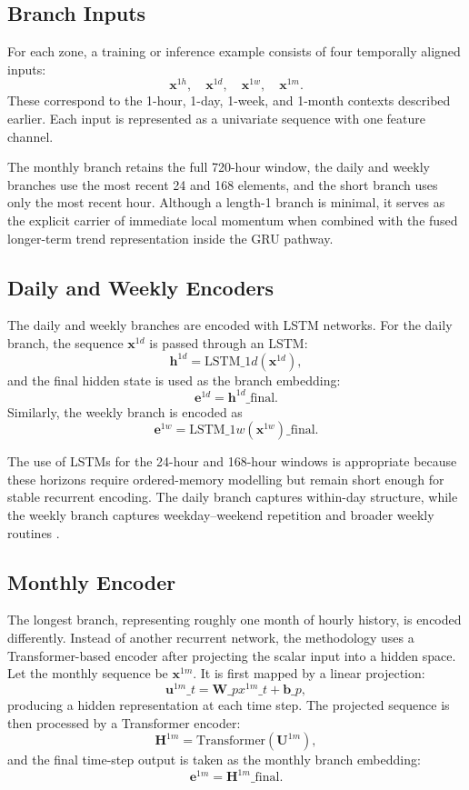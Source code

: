 \documentclass[12pt,a4paper]{report}
\begin{document}
\subsection{Branch Inputs}

For each zone, a training or inference example consists of four temporally aligned inputs:
\[
\mathbf{x}^{1h}, \quad
\mathbf{x}^{1d}, \quad
\mathbf{x}^{1w}, \quad
\mathbf{x}^{1m}.
\]
These correspond to the 1-hour, 1-day, 1-week, and 1-month contexts described earlier. Each input is represented as a univariate sequence with one feature channel.

The monthly branch retains the full 720-hour window, the daily and weekly branches use the most recent 24 and 168 elements, and the short branch uses only the most recent hour. Although a length-1 branch is minimal, it serves as the explicit carrier of immediate local momentum when combined with the fused longer-term trend representation inside the GRU pathway.

\subsection{Daily and Weekly Encoders}

The daily and weekly branches are encoded with LSTM networks. For the daily branch, the sequence \(\mathbf{x}^{1d}\) is passed through an LSTM:
\[
\mathbf{h}^{1d} = \text{LSTM}\_{1d}(\mathbf{x}^{1d}),
\]
and the final hidden state is used as the branch embedding:
\[
\mathbf{e}^{1d} = \mathbf{h}^{1d}\_{\text{final}}.
\]
Similarly, the weekly branch is encoded as
\[
\mathbf{e}^{1w} = \text{LSTM}\_{1w}(\mathbf{x}^{1w})\_{\text{final}}.
\]

The use of LSTMs for the 24-hour and 168-hour windows is appropriate because these horizons require ordered-memory modelling but remain short enough for stable recurrent encoding. The daily branch captures within-day structure, while the weekly branch captures weekday--weekend repetition and broader weekly routines \cite{hochreiter1997lstm,jiang2022survey}.

\subsection{Monthly Encoder}

The longest branch, representing roughly one month of hourly history, is encoded differently. Instead of another recurrent network, the methodology uses a Transformer-based encoder after projecting the scalar input into a hidden space. Let the monthly sequence be \(\mathbf{x}^{1m}\). It is first mapped by a linear projection:
\[
\mathbf{u}^{1m}\_t = \mathbf{W}\_p x^{1m}\_t + \mathbf{b}\_p,
\]
producing a hidden representation at each time step. The projected sequence is then processed by a Transformer encoder:
\[
\mathbf{H}^{1m} = \text{Transformer}(\mathbf{U}^{1m}),
\]
and the final time-step output is taken as the monthly branch embedding:
\[
\mathbf{e}^{1m} = \mathbf{H}^{1m}\_{\text{final}}.
\]
\end{document}
